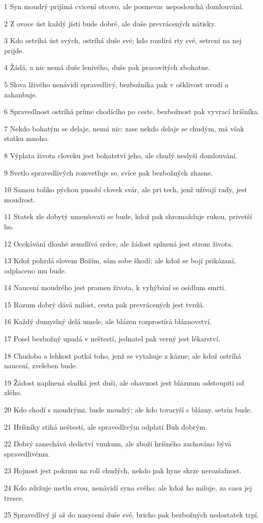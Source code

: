\par 1 Syn moudrý prijímá cvicení otcovo, ale posmevac neposlouchá domlouvání.
\par 2 Z ovoce úst každý jísti bude dobré, ale duše prevrácených nátisky.
\par 3 Kdo ostríhá úst svých, ostríhá duše své; kdo rozdírá rty své, setrení na nej prijde.
\par 4 Žádá, a nic nemá duše lenivého, duše pak pracovitých zbohatne.
\par 5 Slova lživého nenávidí spravedlivý, bezbožníka pak v ošklivost uvodí a zahanbuje.
\par 6 Spravedlnost ostríhá príme chodícího po ceste, bezbožnost pak vyvrací hríšníka.
\par 7 Nekdo bohatým se delaje, nemá nic: zase nekdo delaje se chudým, má však statku mnoho.
\par 8 Výplata života cloveku jest bohatství jeho, ale chudý neslyší domlouvání.
\par 9 Svetlo spravedlivých rozsvetluje se, svíce pak bezbožných zhasne.
\par 10 Samou toliko pýchou pusobí clovek svár, ale pri tech, jenž užívají rady, jest moudrost.
\par 11 Statek zle dobytý umenšovati se bude, kdož pak shromažduje rukou, privetší ho.
\par 12 Ocekávání dlouhé zemdlívá srdce, ale žádost splnená jest strom života.
\par 13 Kdož pohrdá slovem Božím, sám sobe škodí; ale kdož se bojí prikázaní, odplaceno mu bude.
\par 14 Naucení moudrého jest pramen života, k vyhýbání se osídlum smrti.
\par 15 Rozum dobrý dává milost, cesta pak prevrácených jest tvrdá.
\par 16 Každý dumyslný delá umele, ale blázen rozprostírá bláznovství.
\par 17 Posel bezbožný upadá v neštestí, jednatel pak verný jest lékarství.
\par 18 Chudoba a lehkost potká toho, jenž se vytahuje z kázne; ale kdož ostríhá naucení, zveleben bude.
\par 19 Žádost naplnená sladká jest duši, ale ohavnost jest bláznum odstoupiti od zlého.
\par 20 Kdo chodí s moudrými, bude moudrý; ale kdo tovaryší s blázny, setrín bude.
\par 21 Hríšníky stihá neštestí, ale spravedlivým odplatí Buh dobrým.
\par 22 Dobrý zanechává dedictví vnukum, ale zboží hríšného zachováno bývá spravedlivému.
\par 23 Hojnost jest pokrmu na rolí chudých, nekdo pak hyne skrze nerozšafnost.
\par 24 Kdo zdržuje metlu svou, nenávidí syna svého; ale kdož ho miluje, za casu jej tresce.
\par 25 Spravedlivý jí až do nasycení duše své, bricho pak bezbožných nedostatek trpí.

